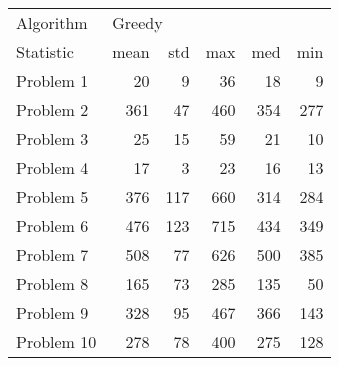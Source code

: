 \begin{tabular}{lrrrrr}
\toprule
Algorithm & \multicolumn{5}{l}{Greedy} \\
Statistic &   mean &  std &  max &  med &  min \\
\midrule
Problem 1  &     20 &    9 &   36 &   18 &    9 \\
Problem 2  &    361 &   47 &  460 &  354 &  277 \\
Problem 3  &     25 &   15 &   59 &   21 &   10 \\
Problem 4  &     17 &    3 &   23 &   16 &   13 \\
Problem 5  &    376 &  117 &  660 &  314 &  284 \\
Problem 6  &    476 &  123 &  715 &  434 &  349 \\
Problem 7  &    508 &   77 &  626 &  500 &  385 \\
Problem 8  &    165 &   73 &  285 &  135 &   50 \\
Problem 9  &    328 &   95 &  467 &  366 &  143 \\
Problem 10 &    278 &   78 &  400 &  275 &  128 \\
\bottomrule
\end{tabular}
